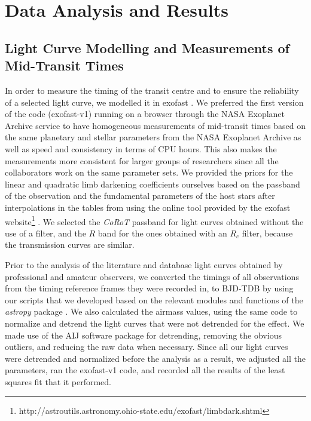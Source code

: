 \documentclass[a4paper,fleqn,usenatbib]{mnras}
\begin{document}
\section{Data Analysis and Results}
\label{sec:analysis} %

\subsection{Light Curve Modelling and Measurements of Mid-Transit Times}
\label{subsec:measurements}
In order to measure the timing of the transit centre and to ensure the reliability of a selected light curve, we modelled it in {\sc exofast} \citep{2013PASP..125...83E}. We preferred the first version of the code ({\sc exofast}-v1) running on a browser through the NASA Exoplanet Archive service to have homogeneous measurements of mid-transit times based on the same planetary and stellar parameters from the NASA Exoplanet Archive as well as speed and consistency in terms of CPU hours. This also makes the measurements more consistent for larger groups of researchers since all the collaborators work on the same parameter sets. We provided the priors for the linear and quadratic limb darkening coefficients ourselves based on the passband of the observation and the fundamental parameters of the host stars after interpolations in the tables from \citet{2011A&A...529A..75C} using the online tool provided by the {\sc exofast} website\footnote{http://astroutils.astronomy.ohio-state.edu/exofast/limbdark.shtml} \citep{2013PASP..125...83E}. We selected the \emph{CoRoT} passband for light curves obtained without the use of a filter, and the $R$ band for the ones obtained with an $R_{c}$ filter, because the transmission curves are similar.

Prior to the analysis of the literature and database light curves obtained by professional and amateur observers, we converted the timings of all observations from the timing reference frames they were recorded in, to BJD-TDB by using our scripts that we developed based on the relevant modules and functions of the \emph{astropy} package \citep{2013A&A...558A..33A, 2018AJ....156..123A}. We also calculated the airmass values, using the same code to normalize and detrend the light curves that were not detrended for the effect. We made use of the AIJ software package for detrending, removing the obvious outliers, and reducing the raw data when necessary. Since all our light curves were detrended and normalized before the analysis as a result, we adjusted all the parameters, ran the {\sc exofast}-v1 code, and recorded all the results of the least squares fit that it performed. 
\end{document}

